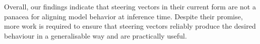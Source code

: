 \documentclass{article}
\begin{document}
Overall, our findings indicate that steering vectors in their current form are not a panacea for aligning model behavior at inference time. Despite their promise, more work is required to ensure that steering vectors reliably produce the desired behaviour in a generalisable way and are practically useful.


\end{document}
